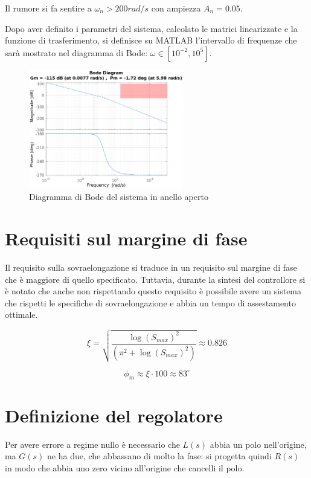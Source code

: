 \documentclass[a4paper]{article}
\begin{document}
Il rumore si fa sentire a $\omega_n > 200 rad/s$ con ampiezza $A_n = 0.05$.
    
Dopo aver definito i parametri del sistema, calcolato le matrici linearizzate e la funzione di trasferimento, si definisce su MATLAB l’intervallo di frequenze che sarà mostrato nel diagramma di Bode: $\omega \in [10^{-2}, 10^5]$.

\begin{figure}[h]
    \centering
    \includegraphics[width=0.6\textwidth]{bode_G}
    \caption{Diagramma di Bode del sistema in anello aperto}
    \label{fig:bode_G}
\end{figure}

\section{Requisiti sul margine di fase}
Il requisito sulla sovraelongazione si traduce in un requisito sul margine di fase che è maggiore di quello specificato.
Tuttavia, durante la sintesi del controllore si è notato che anche non rispettando questo requisito è possibile avere un sistema che rispetti le specifiche di sovraelongazione e abbia un tempo di assestamento ottimale.

\begin{equation}
    \xi = \sqrt{\frac{\log(S_{max})^2}{(\pi^2+\log(S_{max})^2)}} \approx 0.826
    \label{eqn:xi}
\end{equation}

\begin{equation}
    \phi_m \approx \xi \cdot 100 \approx 83^\circ
    \label{eqn:phim}
\end{equation}

\section{Definizione del regolatore}
Per avere errore a regime nullo è necessario che $L(s)$ abbia un polo nell'origine, ma $G(s)$ ne ha due, che abbassano di molto la fase: si progetta quindi $R(s)$ in modo che abbia uno zero vicino all'origine che cancelli il polo.
\end{document}
